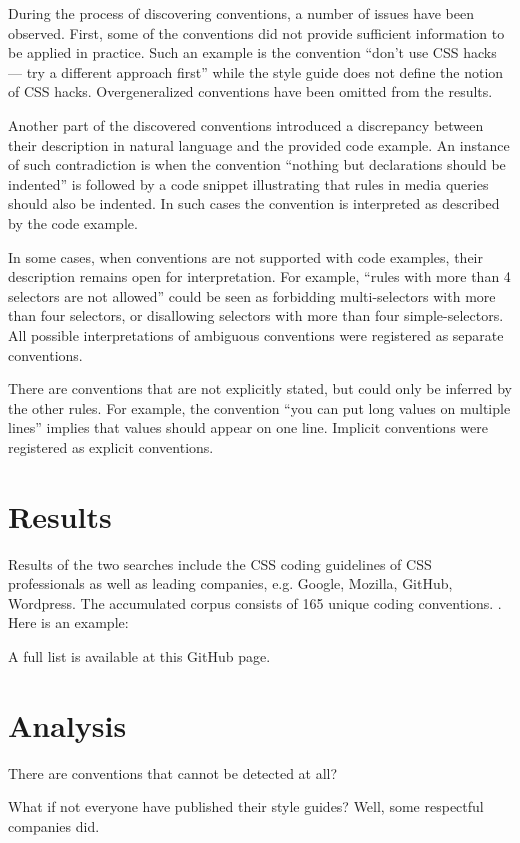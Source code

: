 \documentclass[parskip=full]{uvamscse}
\begin{document}
During the process of discovering conventions, a number of issues have been observed. First, some of
the conventions did not provide sufficient information to be applied in practice. Such an example is
the convention ``don’t use CSS hacks — try a different approach first'' while the style guide does
not define the notion of CSS hacks. Overgeneralized conventions have been omitted from the results.

Another part of the discovered conventions introduced a discrepancy between their description in
natural language and the provided code example. An instance of such contradiction is when the
convention ``nothing but declarations should be indented'' is followed by a code snippet
illustrating that rules in media queries should also be indented. In such cases the convention is
interpreted as described by the code example.

In some cases, when conventions are not supported with code examples, their description remains open
for interpretation. For example, ``rules with more than 4 selectors are not allowed'' could be seen
as forbidding multi-selectors with more than four selectors, or disallowing selectors with more than
four simple-selectors. All possible interpretations of ambiguous conventions were registered as
separate conventions.

There are conventions that are not explicitly stated, but could only be inferred by the other rules.
For example, the convention ``you can put long values on multiple lines'' implies that values
should appear on one line. Implicit conventions were registered as explicit conventions.

\section{Results}

Results of the two searches include the CSS coding guidelines of CSS professionals as well as
leading companies, e.g. Google, Mozilla, GitHub, Wordpress. The accumulated corpus consists of 165
unique coding conventions. . Here is an example:

A full list is available at this GitHub page.

\section{Analysis}

There are conventions that cannot be detected at all?

What if not everyone have published their style guides? Well, some respectful companies did.
\end{document}
